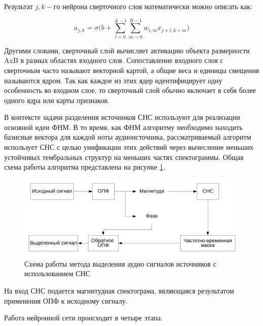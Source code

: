 Результат $j,k-го$ нейрона сверточного слоя математически можно описать как:

\begin{equation}
a_{j,k} = \sigma \Bigg(b + \sum_{l=0}^{A-1} \sum_{m=0}^{B-1} w_{i,m}x_{j+l,k+m}\Bigg)
\end{equation}

Другими словами, сверточный слой вычисляет активацию объекта размерности AxB в разных областях входного слоя. Сопоставление входного слоя с сверточным часто называют векторной картой, а общие веса и единицы смещения называются ядром. Так как каждое из этих ядер идентифицирует одну особенность во входном слое, то сверточный слой обычно включает в себя более одного ядра или карты признаков.

В контексте задачи разделения источников СНС используют для реализации основной идеи ФНМ. В то время, как ФНМ алгоритму необходимо находить базисные вектора для каждой ноты аудиоисточника, рассматриваемый алгоритм использует СНС с целью унификации этих действий через вычесление меньших устойчивых тембральных структур на меньших частях спектограммы. Общая схема работы алгоритма представлена на рисунке \ref{anal:CNN}.

\begin{figure}
	\centering
	\includegraphics[width=\textwidth]{inc/img/CNN}
	\caption{Схема работы метода выделения аудио сигналов источников с использованием СНС}
	\label{anal:CNN}
\end{figure}

На вход СНС подается магнитудная спектограма, являющаяся результатом применения ОПФ к исходному сигналу. 

Работа нейронной сети происходит в четыре этапа:

